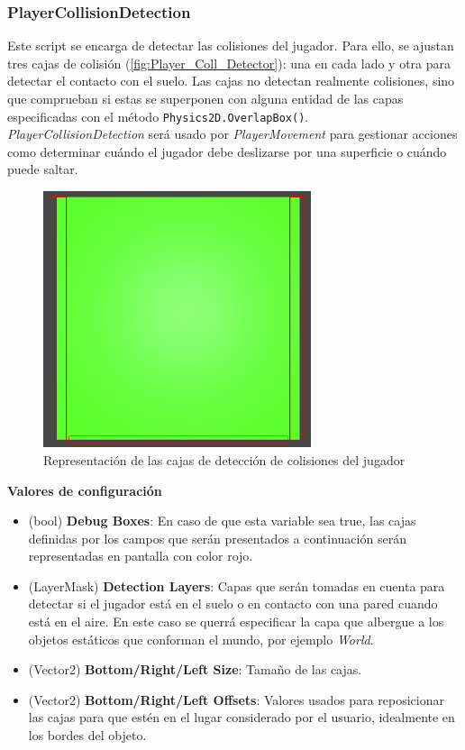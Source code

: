 \subsubsection{PlayerCollisionDetection}

Este script se encarga de detectar las colisiones del jugador. Para ello, se ajustan tres cajas de colisión (\autoref{fig:Player_Coll_Detector}): una en cada lado y otra para detectar el contacto con el suelo. Las cajas no detectan realmente colisiones, sino que comprueban si estas se superponen con alguna entidad de las capas especificadas con el método \texttt{Physics2D.OverlapBox()}.\\

\textit{PlayerCollisionDetection} será usado por \textit{PlayerMovement} para gestionar acciones como determinar cuándo el jugador debe deslizarse por una superficie o cuándo puede saltar.\\

\begin{figure}[t]
	\centering
	\includegraphics[width = 0.7\textwidth]{Imagenes/CollDetector.png}
	\caption{Representación de las cajas de detección de colisiones del jugador}
	\label{fig:Player_Coll_Detector}
\end{figure}

\textbf{Valores de configuración}
\begin{itemize}
	\item (bool) \textbf{ Debug Boxes}: En caso de que esta variable sea true, las cajas definidas por los campos que serán presentados a continuación serán representadas en pantalla con color rojo.
	\item (LayerMask)  \textbf{Detection Layers}: Capas que serán tomadas en cuenta para detectar si el jugador está en el suelo o en contacto con una pared cuando está en el aire. En este caso se querrá especificar la capa que albergue a los objetos estáticos que conforman el mundo, por ejemplo \textit{World}.
	\item (Vector2) \textbf{Bottom/Right/Left Size}: Tamaño de las cajas.
	\item (Vector2) \textbf{Bottom/Right/Left Offsets}: Valores usados para reposicionar las cajas para que estén en el lugar considerado por el usuario, idealmente en los bordes del objeto.
\end{itemize}

